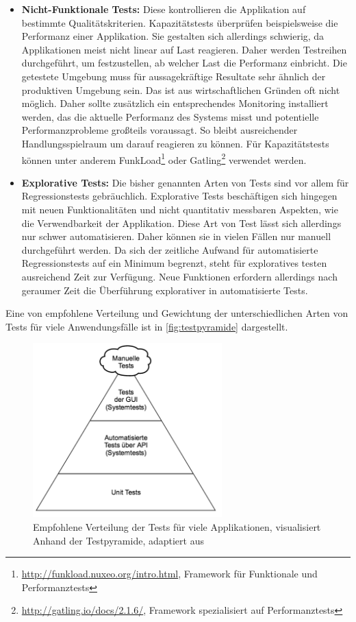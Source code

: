 \begin{itemize}
	\item \textbf{Nicht-Funktionale Tests:} Diese kontrollieren die Applikation auf bestimmte Qualitätskriterien. Kapazitätstests überprüfen beispielsweise die Performanz einer Applikation. Sie gestalten sich allerdings schwierig, da Applikationen meist nicht linear auf Last reagieren. Daher werden Testreihen durchgeführt, um festzustellen, ab welcher Last die Performanz einbricht. Die getestete Umgebung muss für aussagekräftige Resultate sehr ähnlich der produktiven Umgebung sein. Das ist aus wirtschaftlichen Gründen oft nicht möglich. Daher sollte zusätzlich ein entsprechendes Monitoring installiert werden, das die aktuelle Performanz des Systems misst und potentielle Performanzprobleme großteils voraussagt. So bleibt ausreichender Handlungsspielraum um darauf reagieren zu können. Für Kapazitätstests können unter anderem FunkLoad\footnote{\url{http://funkload.nuxeo.org/intro.html}, Framework für Funktionale und Performanztests} oder Gatling\footnote{\url{http://gatling.io/docs/2.1.6/}, Framework spezialisiert auf Performanztests} verwendet werden.
	\item \textbf{Explorative Tests:} Die bisher genannten Arten von Tests sind vor allem für Regressionstests gebräuchlich. Explorative Tests beschäftigen sich hingegen mit neuen Funktionalitäten und nicht quantitativ messbaren Aspekten, wie die Verwendbarkeit der Applikation. Diese Art von Test lässt sich allerdings nur schwer automatisieren. Daher können sie in vielen Fällen nur manuell durchgeführt werden. Da sich der zeitliche Aufwand für automatisierte Regressionstests auf ein Minimum begrenzt, steht für exploratives testen ausreichend Zeit zur Verfügung. Neue Funktionen erfordern allerdings nach geraumer Zeit die Überführung explorativer in automatisierte Tests. 
\end{itemize}

Eine von \cite{wolff2014} empfohlene Verteilung und Gewichtung der unterschiedlichen Arten von Tests für viele Anwendungsfälle ist in \autoref{fig:testpyramide} dargestellt.

\begin{figure}[ht]
	\centering
	\includegraphics[width=0.65\textwidth]{img/testpyramide.png}
	\caption[Testpyramide, adaptiert aus \cite{wolff2014}]{Empfohlene Verteilung der Tests für viele Applikationen, visualisiert Anhand der Testpyramide, adaptiert aus \cite{wolff2014}}
	\label{fig:testpyramide}
\end{figure}  

